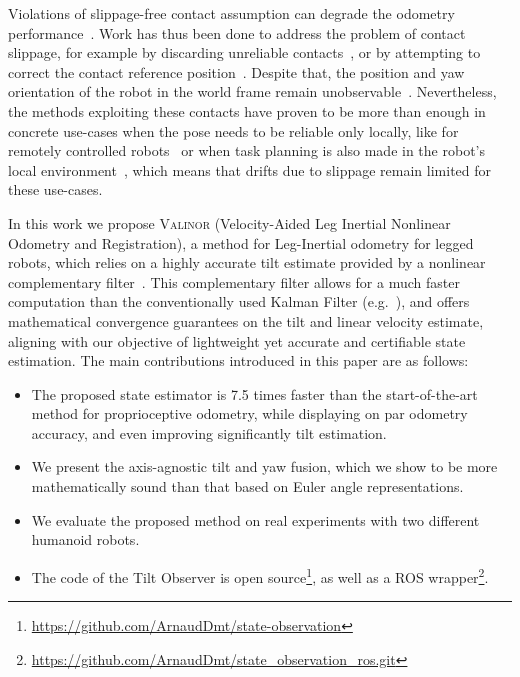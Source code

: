 \documentclass{IJCAS}
\begin{document}
 Violations of slippage-free contact assumption can degrade the odometry performance~\cite{lin2021legged, maravgakis2023probabilistic}. Work has thus been done to address the problem of contact slippage, for example by discarding unreliable contacts~\cite{lin2021legged, maravgakis2023probabilistic,yoon2023InvariantSmootherDynamicContactEventInformation}, or by attempting to correct the contact reference position~\cite{bloesch2013FusionLegKineAndImu,Hartley2020RIEKF, Demont2024KineticsObserver}. Despite that, the position and yaw orientation of the robot in the world frame remain unobservable~\cite{bloesch2013FusionLegKineAndImu}. Nevertheless, the methods exploiting these contacts have proven to be more than enough in concrete use-cases when the pose needs to be reliable only locally, like for remotely controlled robots~\cite{Grandia2024DesignControlBipedalRoboticCharacter} or when task planning is also made in the robot's local environment~\cite{Tsuru2023OnlineMulticontactReplanningHumanoid}, which means that drifts due to slippage remain limited for these use-cases.

In this work we propose {\scshape Valinor} (Velocity-Aided Leg Inertial Nonlinear Odometry and Registration), a method for Leg-Inertial odometry for legged robots, which relies on a highly accurate tilt estimate provided by a nonlinear complementary filter~\cite{benallegue2020LyapunovStableOrientationEstimatorHumanoids}. This complementary filter allows for a much faster computation than the conventionally used Kalman Filter (e.g.~\cite{Hartley2020RIEKF}), and offers mathematical convergence guarantees on the tilt and linear velocity estimate, aligning with our objective of lightweight yet accurate and certifiable state estimation.
The main contributions introduced in this paper are as follows:
\begin{itemize}
  \item The proposed state estimator is 7.5 times faster than the start-of-the-art method for proprioceptive odometry, while displaying on par odometry accuracy, and even improving significantly tilt estimation.
  \item We present the axis-agnostic tilt and yaw fusion, which we show to be more mathematically sound than that based on Euler angle representations.
  \item We evaluate the proposed method on real experiments with two different humanoid robots.
  \item The code of the Tilt Observer is open source\footnote{\scriptsize \url{https://github.com/ArnaudDmt/state-observation}}, as well as a ROS wrapper\footnote{\scriptsize \url{https://github.com/ArnaudDmt/state_observation_ros.git}}.
\end{itemize}
\end{document}
